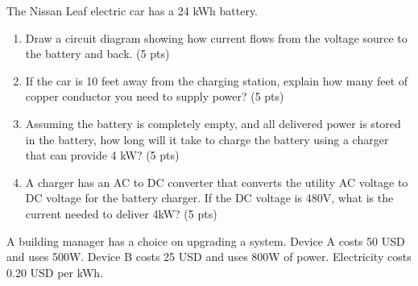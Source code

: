 \documentclass[12pt, oneside]{article}
\begin{document}
\newpage
{}

The Nissan Leaf electric car has a 24 kWh battery.

\begin{enumerate}

\item Draw a circuit diagram showing how current flows from the voltage
source to the battery and back. (5 pts)

\solution{}

\vfill

\item If the car is 10 feet away from the charging station, explain how
many feet of copper conductor you need to supply power? (5 pts)


\vfill

\item Assuming the battery is completely empty, and all delivered power is
stored in the battery, how long will it take to
charge the battery using a charger that can provide 4 kW? (5 pts)


\vfill

\item A charger has an AC to DC converter that converts the utility AC
voltage to DC voltage for the battery charger.  If the DC voltage is
480V, what is the current needed to deliver 4kW? (5 pts)


\vfill

\end{enumerate}


\newpage
{}

A building manager has a choice on upgrading a system.  Device A
costs 50 USD and uses 500W.  Device B costs 25 USD and uses 800W of
power.  Electricity costs 0.20 USD per kWh.
\end{document}
